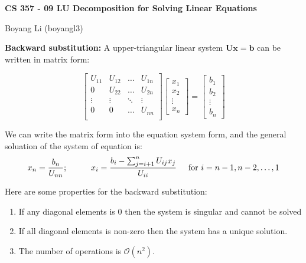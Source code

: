 \documentclass[12pt]{article}
\begin{document}
\begin{center}\Large\bf 
CS 357 - 09 LU Decomposition for Solving Linear Equations\\
\end{center}
\begin{center}
Boyang Li (boyangl3)
\end{center}

\medskip
\noindent \textbf{Backward substitution:} A upper-triangular linear system $\mathbf{Ux} = \mathbf{b}$ can be written in matrix form: 

$$\begin{bmatrix} U_{11} & U_{12} & \ldots & U_{1n} \\ 0 & U_{22} & \ldots & U_{2n} \\ \vdots & \vdots & \ddots & \vdots \\ 0 & 0 & \ldots & U_{nn} \\ \end{bmatrix} \begin{bmatrix} x_1 \\ x_2 \\ \vdots \\ x_n \end{bmatrix} = \begin{bmatrix} b_1 \\ b_2 \\ \vdots \\ b_n \end{bmatrix}$$

We can write the matrix form into the equation system form, and the general soluation of the system of equation is: 
$$x_n = \frac{b_n}{U_{nn}}; \hspace{1cm} x_i = \frac{b_i - \sum_{j=i+1}^n U_{ij} x_j}{U_{ii}} \hspace{5mm} \text{for }i = n-1, n-2, \dots, 1$$

Here are some properties for the backward substitution:
    \begin{enumerate}
        \item If any diagonal elements is 0 then the system is singular and cannot be solved
        \item If all diagonal elements is non-zero then the system has a unique solution.
        \item The number of operations is $\mathcal{O}(n^2)$.
    \end{enumerate}
\end{document}
